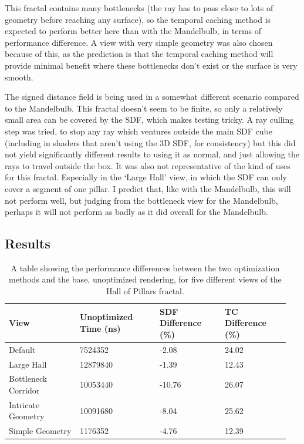 This fractal contains many bottlenecks (the ray has to pass close to lots of geometry before reaching any surface), so the temporal caching method is expected to perform better here than with the Mandelbulb, in terms of performance difference. A view with very simple geometry was also chosen because of this, as the prediction is that the temporal caching method will provide minimal benefit where these bottlenecks don't exist or the surface is very smooth.\newline

The signed distance field is being used in a somewhat different scenario compared to the Mandelbulb. This fractal doesn't seem to be finite, so only a relatively small area can be covered by the SDF, which makes testing tricky. A ray culling step was tried, to stop any ray which ventures outside the main SDF cube (including in shaders that aren't using the 3D SDF, for consistency) but this did not yield significantly different results to using it as normal, and just allowing the rays to travel outside the box. It was also not representative of the kind of uses for this fractal. Especially in the `Large Hall' view, in which the SDF can only cover a segment of one pillar. I predict that, like with the Mandelbulb, this will not perform well, but judging from the bottleneck view for the Mandelbulb, perhaps it will not perform as badly as it did overall for the Mandelbulb.

\subsection{Results}

\begin{table}[ht]
	\centering
	\begin{tabular}{||p{0.24\linewidth}|p{0.27\linewidth}|p{0.22\linewidth}|p{0.22\linewidth}||}
		\hline
		View & Unoptimized Time (ns) & SDF Difference (\%) & TC Difference (\%)\\
		\hline\hline
		Default & 7524352 & -2.08 & 24.02\\
		\hline
		Large Hall & 12879840 & -1.39 & 12.43\\
		\hline
		Bottleneck Corridor & 10053440 & -10.76 & 26.07\\
		\hline
		Intricate Geometry & 10091680 & -8.04 & 25.62\\
		\hline
		Simple Geometry & 1176352 & -4.76 & 12.39\\
		\hline
	\end{tabular}
	\caption{A table showing the performance differences between the two optimization methods and the base, unoptimized rendering, for five different views of the Hall of Pillars fractal.}
	\label{table:hall-of-pillars-static-results}
\end{table}

